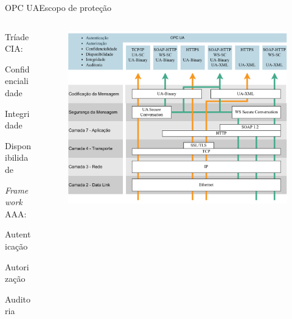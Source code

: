 \documentclass{uspBeamer}
\begin{document}
    \begin{frame}{OPC UA}{Escopo de proteção}
        \begin{columns}
            \begin{column}{.3\textwidth}
                \begin{wideitemize}
                    \item Tríade CIA:
                    \begin{wideitemize}
                        \item Confidencialidade
                        \item Integridade
                        \item Disponibilidade
                    \end{wideitemize}
                    \item \textit{Framework} AAA:
                    \begin{wideitemize}
                        \item Autenticação
                        \item Autorização
                        \item Auditoria
                    \end{wideitemize}
                \end{wideitemize}
            \end{column}
            \begin{column}{.7\textwidth}
                \begin{figure}
                    \includegraphics[height=.83\textheight]{ua-osi.png}
                \end{figure}
            \end{column}
        \end{columns}
    \end{frame}
\end{document}
